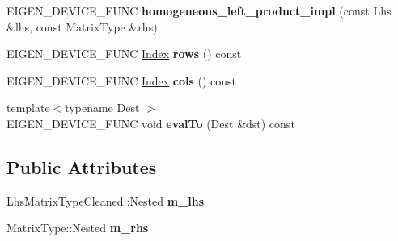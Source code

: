 \begin{DoxyCompactItemize}
E\+I\+G\+E\+N\+\_\+\+D\+E\+V\+I\+C\+E\+\_\+\+F\+U\+NC {\bfseries homogeneous\+\_\+left\+\_\+product\+\_\+impl} (const Lhs \&lhs, const Matrix\+Type \&rhs)
\item 
\mbox{\label{struct_eigen_1_1internal_1_1homogeneous__left__product__impl_3_01_homogeneous_3_01_matrix_type_042480d8c61b8193bc4c7039abeeef67a_a82500824ec1679fe92e83aebe57ae5c3}} 
E\+I\+G\+E\+N\+\_\+\+D\+E\+V\+I\+C\+E\+\_\+\+F\+U\+NC \hyperlink{namespace_eigen_a62e77e0933482dafde8fe197d9a2cfde}{Index} {\bfseries rows} () const
\item 
\mbox{\label{struct_eigen_1_1internal_1_1homogeneous__left__product__impl_3_01_homogeneous_3_01_matrix_type_042480d8c61b8193bc4c7039abeeef67a_a2d4c98637bdb643e19e04d248d951c2f}} 
E\+I\+G\+E\+N\+\_\+\+D\+E\+V\+I\+C\+E\+\_\+\+F\+U\+NC \hyperlink{namespace_eigen_a62e77e0933482dafde8fe197d9a2cfde}{Index} {\bfseries cols} () const
\item 
\mbox{\label{struct_eigen_1_1internal_1_1homogeneous__left__product__impl_3_01_homogeneous_3_01_matrix_type_042480d8c61b8193bc4c7039abeeef67a_adbfc9287d4a0983a7b6ef20164827bd6}} 
{\footnotesize template$<$typename Dest $>$ }\\E\+I\+G\+E\+N\+\_\+\+D\+E\+V\+I\+C\+E\+\_\+\+F\+U\+NC void {\bfseries eval\+To} (Dest \&dst) const
\end{DoxyCompactItemize}
\subsection*{Public Attributes}
\begin{DoxyCompactItemize}
\item 
\mbox{\label{struct_eigen_1_1internal_1_1homogeneous__left__product__impl_3_01_homogeneous_3_01_matrix_type_042480d8c61b8193bc4c7039abeeef67a_ab544fa7af886024b3f6ae9b21ee4e4b2}} 
Lhs\+Matrix\+Type\+Cleaned\+::\+Nested {\bfseries m\+\_\+lhs}
\item 
\mbox{\label{struct_eigen_1_1internal_1_1homogeneous__left__product__impl_3_01_homogeneous_3_01_matrix_type_042480d8c61b8193bc4c7039abeeef67a_a9d701ea9a8a74e520419ec7071c7028a}} 
Matrix\+Type\+::\+Nested {\bfseries m\+\_\+rhs}
\end{DoxyCompactItemize}



